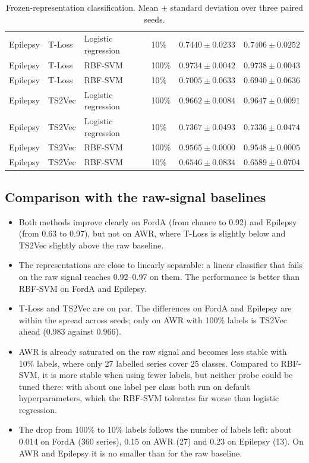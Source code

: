 \documentclass[a4paper,11pt]{article}
\begin{document}
\begin{table}[htbp]
\begin{tabular}{l l l l c c}
        Epilepsy & T-Loss & Logistic regression & 10\%  & $0.7440 \pm 0.0233$ & $0.7406 \pm 0.0252$ \\
        Epilepsy & T-Loss & RBF-SVM             & 100\% & $0.9734 \pm 0.0042$ & $0.9738 \pm 0.0043$ \\
        Epilepsy & T-Loss & RBF-SVM             & 10\%  & $0.7005 \pm 0.0633$ & $0.6940 \pm 0.0636$ \\
        Epilepsy & TS2Vec & Logistic regression & 100\% & $0.9662 \pm 0.0084$ & $0.9647 \pm 0.0091$ \\
        Epilepsy & TS2Vec & Logistic regression & 10\%  & $0.7367 \pm 0.0493$ & $0.7336 \pm 0.0474$ \\
        Epilepsy & TS2Vec & RBF-SVM             & 100\% & $0.9565 \pm 0.0000$ & $0.9548 \pm 0.0005$ \\
        Epilepsy & TS2Vec & RBF-SVM             & 10\%  & $0.6546 \pm 0.0834$ & $0.6589 \pm 0.0704$ \\
        \bottomrule
    \end{tabular}
    \caption{Frozen-representation classification. Mean $\pm$ standard deviation over three paired seeds.}
    \label{tab:ssl-clean}
\end{table}

\subsection{Comparison with the raw-signal baselines}
\begin{itemize}
    \item Both methods improve clearly on FordA (from chance to 0.92) and Epilepsy (from 0.63 to 0.97), but not on AWR, where T-Loss is slightly below and TS2Vec slightly above the raw baseline.
    \item The representations are close to linearly separable: a linear classifier that fails on the raw signal reaches 0.92--0.97 on them. The performance is better than RBF-SVM on FordA and Epilepsy.
    \item T-Loss and TS2Vec are on par. The differences on FordA and Epilepsy are within the spread across seeds; only on AWR with 100\% labels is TS2Vec ahead (0.983 against 0.966).
    \item AWR is already saturated on the raw signal and becomes less stable with 10\% labels, where only 27 labelled series cover 25 classes. Compared to RBF-SVM, it is more stable when using fewer labels, but neither probe could be tuned there: with about one label per class both run on default hyperparameters, which the RBF-SVM tolerates far worse than logistic regression.
    \item The drop from 100\% to 10\% labels follows the number of labels left: about 0.014 on FordA (360 series), 0.15 on AWR (27) and 0.23 on Epilepsy (13). On AWR and Epilepsy it is no smaller than for the raw baseline.
\end{itemize}
\end{document}

